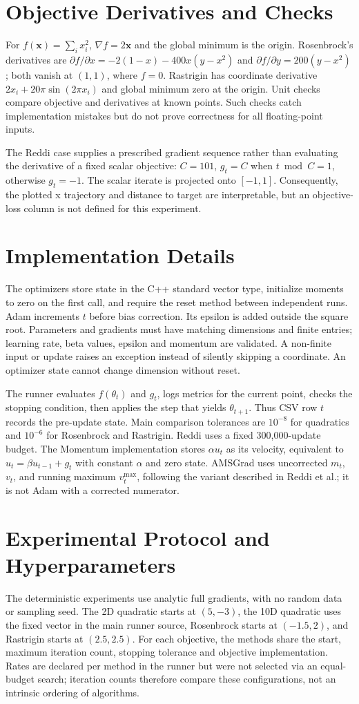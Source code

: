 \documentclass[conference]{IEEEtran}
\begin{document}
\section{Objective Derivatives and Checks}
For $f(\mathbf{x})=\sum_i x_i^2$, $\nabla f=2\mathbf{x}$ and the global minimum is the origin. Rosenbrock's derivatives are $\partial f/\partial x=-2(1-x)-400x(y-x^2)$ and $\partial f/\partial y=200(y-x^2)$; both vanish at $(1,1)$, where $f=0$. Rastrigin has coordinate derivative $2x_i+20\pi\sin(2\pi x_i)$ and global minimum zero at the origin. Unit checks compare objective and derivatives at known points. Such checks catch implementation mistakes but do not prove correctness for all floating-point inputs.

The Reddi case supplies a prescribed gradient sequence rather than evaluating the derivative of a fixed scalar objective: $C=101$, $g_t=C$ when $t\bmod C=1$, otherwise $g_t=-1$. The scalar iterate is projected onto $[-1,1]$. Consequently, the plotted x trajectory and distance to target are interpretable, but an objective-loss column is not defined for this experiment.
\section{Implementation Details}
The optimizers store state in the C++ standard vector type, initialize moments to zero on the first call, and require the reset method between independent runs. Adam increments $t$ before bias correction. Its epsilon is added outside the square root. Parameters and gradients must have matching dimensions and finite entries; learning rate, beta values, epsilon and momentum are validated. A non-finite input or update raises an exception instead of silently skipping a coordinate. An optimizer state cannot change dimension without reset.

The runner evaluates $f(\theta_t)$ and $g_t$, logs metrics for the current point, checks the stopping condition, then applies the step that yields $\theta_{t+1}$. Thus CSV row $t$ records the pre-update state. Main comparison tolerances are $10^{-8}$ for quadratics and $10^{-6}$ for Rosenbrock and Rastrigin. Reddi uses a fixed 300,000-update budget. The Momentum implementation stores $\alpha u_t$ as its velocity, equivalent to $u_t=\beta u_{t-1}+g_t$ with constant $\alpha$ and zero state. AMSGrad uses uncorrected $m_t$, $v_t$, and running maximum $v_t^{\max}$, following the variant described in Reddi et al.; it is not Adam with a corrected numerator.
\section{Experimental Protocol and Hyperparameters}
The deterministic experiments use analytic full gradients, with no random data or sampling seed. The 2D quadratic starts at $(5,-3)$, the 10D quadratic uses the fixed vector in the main runner source, Rosenbrock starts at $(-1.5,2)$, and Rastrigin starts at $(2.5,2.5)$. For each objective, the methods share the start, maximum iteration count, stopping tolerance and objective implementation. Rates are declared per method in the runner but were not selected via an equal-budget search; iteration counts therefore compare these configurations, not an intrinsic ordering of algorithms.
\end{document}
